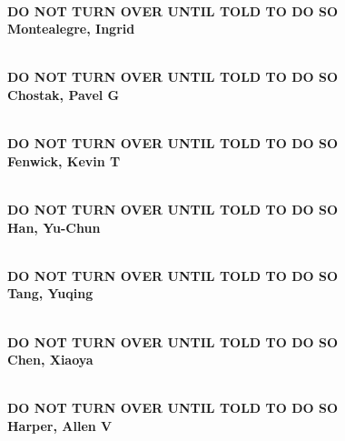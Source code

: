 \documentclass[11pt]{article}
\begin{document}
\begin{center}
{\Large\bf
\mbox{\ }\\
\vspace{1in}
DO NOT TURN OVER UNTIL TOLD TO DO SO\\
\vspace{1in}
Montealegre, Ingrid
}
\end{center}
\newpage

\begin{center}
{\Large\bf
\mbox{\ }\\
\vspace{1in}
DO NOT TURN OVER UNTIL TOLD TO DO SO\\
\vspace{1in}
Chostak, Pavel G
}
\end{center}
\newpage

\begin{center}
{\Large\bf
\mbox{\ }\\
\vspace{1in}
DO NOT TURN OVER UNTIL TOLD TO DO SO\\
\vspace{1in}
Fenwick, Kevin T
}
\end{center}
\newpage

\begin{center}
{\Large\bf
\mbox{\ }\\
\vspace{1in}
DO NOT TURN OVER UNTIL TOLD TO DO SO\\
\vspace{1in}
Han, Yu-Chun
}
\end{center}
\newpage

\begin{center}
{\Large\bf
\mbox{\ }\\
\vspace{1in}
DO NOT TURN OVER UNTIL TOLD TO DO SO\\
\vspace{1in}
Tang, Yuqing
}
\end{center}
\newpage

\begin{center}
{\Large\bf
\mbox{\ }\\
\vspace{1in}
DO NOT TURN OVER UNTIL TOLD TO DO SO\\
\vspace{1in}
Chen, Xiaoya
}
\end{center}
\newpage

\begin{center}
{\Large\bf
\mbox{\ }\\
\vspace{1in}
DO NOT TURN OVER UNTIL TOLD TO DO SO\\
\vspace{1in}
Harper, Allen V
}
\end{center}
\newpage
\end{document}
